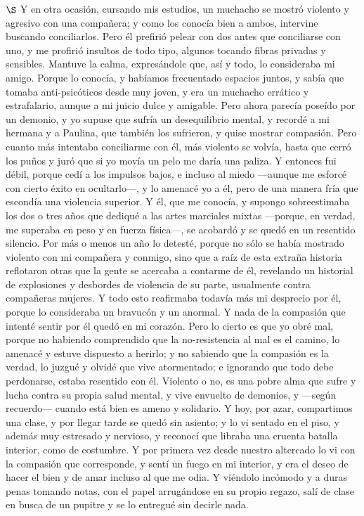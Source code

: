 \documentclass[a4paper, 12pt]{article}
\begin{document}
\newpage


$\S$ Y en otra ocasión, cursando mis estudios, un muchacho se mostró violento y
agresivo con una compañera; y como los conocía bien a ambos, intervine buscando
conciliarlos. Pero él prefirió pelear con dos antes que conciliarse con uno, y me
profirió insultos de todo tipo, algunos tocando fibras privadas y sensibles.
Mantuve la calma, expresándole que, así y todo, lo consideraba mi amigo. Porque
lo conocía, y habíamos frecuentado espacios juntos, y sabía que tomaba
anti-psicóticos desde muy joven, y era un muchacho errático y estrafalario,
aunque a mi juicio dulce y amigable. Pero ahora parecía poseído por un demonio,
y yo supuse que sufría un desequilibrio mental, y recordé a mi hermana y a
Paulina, que también los sufrieron, y quise mostrar compasión. Pero cuanto más
intentaba conciliarme con él, más violento se volvía, hasta que cerró los puños
y juró que si yo movía un pelo me daría una paliza. Y entonces fui débil, porque
cedí a los impulsos bajos, e incluso al miedo ---aunque me esforcé con cierto
éxito en ocultarlo---, y lo amenacé yo a él, pero de una manera fría que
escondía una violencia superior. Y él, que me conocía, y supongo sobreestimaba
los dos o tres años que dediqué a las artes marciales mixtas ---porque, en
verdad, me superaba en peso y en fuerza física---, se acobardó y se quedó en un
resentido silencio. Por más o menos un año lo detesté, porque no sólo se había
mostrado violento con mi compañera y conmigo, sino que a raíz de esta extraña
historia reflotaron otras que la gente se acercaba a contarme de él, revelando
un historial de explosiones y desbordes de violencia de su parte, usualmente
contra compañeras mujeres. Y todo esto reafirmaba todavía más mi desprecio por
él, porque lo consideraba un bravucón y un anormal. Y nada de la compasión que
intenté sentir por él quedó en mi corazón. Pero lo cierto es que yo obré mal,
porque no habiendo comprendido que la no-resistencia al mal es el camino, lo
amenacé y estuve dispuesto a herirlo; y no sabiendo que la compasión es la
verdad, lo juzgué y olvidé que vive atormentado; e ignorando que todo debe
perdonarse, estaba resentido con él. Violento o no, es una pobre alma que sufre
y lucha contra su propia salud mental, y vive envuelto de demonios, y ---según
recuerdo--- cuando está bien es ameno y solidario. Y hoy, por azar, compartimos
una clase, y por llegar tarde se quedó sin asiento; y lo vi sentado en el piso,
y además muy estresado y nervioso, y reconocí que libraba una cruenta batalla
interior, como de costumbre. Y por primera vez desde nuestro altercado lo vi con
la compasión que corresponde, y sentí un fuego en mi interior, y era el deseo de
hacer el bien y de amar incluso al que me odia. Y viéndolo incómodo y a duras
penas tomando notas, con el papel arrugándose en su propio regazo, salí de clase
en busca de un pupitre y se lo entregué sin decirle nada.
\end{document}
